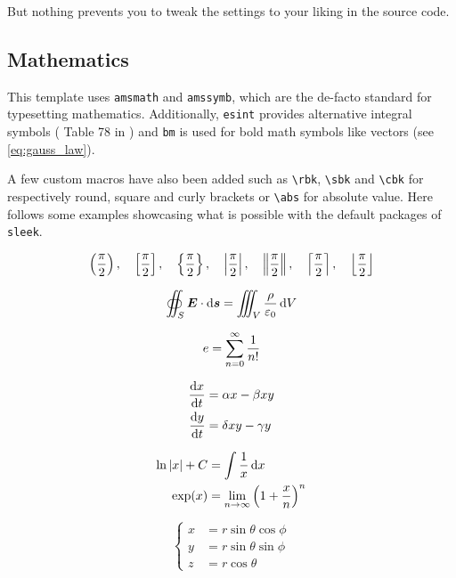 \documentclass[a4paper, 12pt]{report}
\def\tbs{\textbackslash}
\begin{document}
    But nothing prevents you to tweak the settings to your liking in the source code.

    \subsection{Mathematics}

    This template uses \texttt{amsmath} and \texttt{amssymb}, which are the de-facto standard for typesetting mathematics. Additionally, \texttt{esint} provides alternative integral symbols (\cf{} Table 78 in \cite{pakin2020comprehensive}) and \texttt{bm} is used for bold math symbols like vectors (see \eqref{eq:gauss_law}).

    A few custom macros have also been added such as \texttt{\tbs{}rbk}, \texttt{\tbs{}sbk} and \texttt{\tbs{}cbk} for respectively round, square and curly brackets or \texttt{\tbs{}abs} for absolute value. Here follows some examples showcasing what is possible with the default packages of \texttt{sleek}.

    \[
        \left(\frac{\pi}{2}\right), \quad \left[\frac{\pi}{2}\right], \quad \left\{\frac{\pi}{2}\right\}, \quad \left|\frac{\pi}{2}\right|, \quad \left\|\frac{\pi}{2}\right\|, \quad \left\lceil\frac{\pi}{2}\right\rceil, \quad \left\lfloor\frac{\pi}{2}\right\rfloor
    \]

    \begin{equation}\label{eq:gauss_law}
        \oiint_S \bm{E} \cdot \operatorname{d}\!{\bm{s}} = \iiint_V \frac{\rho}{\varepsilon_0} \operatorname{d}\!{V}
    \end{equation}

    \begin{equation*}
        e = \sum_{n=0}^\infty \frac{1}{n!}
    \end{equation*}

    \begin{subequations}
        \begin{align}
            \frac{\operatorname{d}\!{x}}{\operatorname{d}\!{t}} & = \alpha x - \beta xy \\
            \frac{\operatorname{d}\!{y}}{\operatorname{d}\!{t}} & = \delta xy - \gamma y
        \end{align}
    \end{subequations}

    \begin{align*}
        \ln \left|x\right| + C & = \int \frac{1}{x} \operatorname{d}\!{x} \\
        \exp(x) & = \lim_{n \to \infty} \left(1 + \frac{x}{n}\right)^n
    \end{align*}

    \begin{equation}
        \left\{
        \begin{aligned}
            x & = r \sin \theta \cos \phi \\
            y & = r \sin \theta \sin \phi \\
            z & = r \cos \theta
        \end{aligned}
        \right.
    \end{equation}
\end{document}
